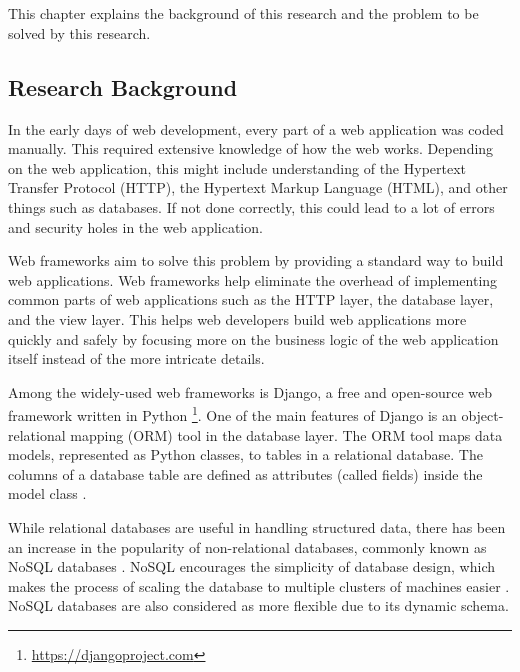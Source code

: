 \chapter{\babSatu}

This chapter explains the background of this research and the problem to be
solved by this research.

\section{Research Background}

In the early days of web development, every part of a web application was coded
manually. This required extensive knowledge of how the web works. Depending on
the web application, this might include understanding of the Hypertext Transfer
Protocol (HTTP), the Hypertext Markup Language (HTML), and other things such as
databases. If not done correctly, this could lead to a lot of errors and
security holes in the web application.

Web frameworks aim to solve this problem by providing a standard way to build
web applications. Web frameworks help eliminate the overhead of implementing
common parts of web applications such as the HTTP layer, the database layer,
and the view layer. This helps web developers build web applications more
quickly and safely by focusing more on the business logic of the web
application itself instead of the more intricate details.

Among the widely-used web frameworks is Django, a free and open-source web
framework written in Python \footnote{\url{https://djangoproject.com}}. One of
the main features of Django is an object-relational mapping (ORM) tool in the
database layer. The ORM tool maps data models, represented as Python classes,
to tables in a relational database. The columns of a database table are defined
as attributes (called fields) inside the model class \cite{django}.

While relational databases are useful in handling structured data, there has
been an increase in the popularity of non-relational databases, commonly known
as NoSQL databases \cite{paul_nosql}. NoSQL encourages the simplicity of
database design, which makes the process of scaling the database to multiple
clusters of machines easier \cite{leavitt_nosql}. NoSQL databases are also
considered as more flexible due to its dynamic schema.

